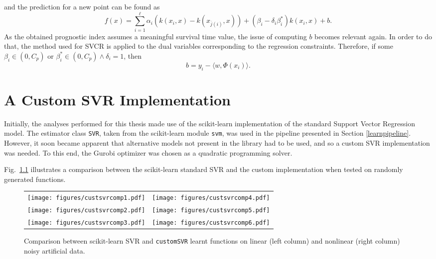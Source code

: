 \documentclass[12pt]{report}
\begin{document}
and the prediction for a new point can be found as
\begin{equation} \label{model2f}
f(x) = \sum_{i=1}^{\ell}\alpha_{i}(k(x_{i},x) - k(x_{\overline{j}(i)},x))+(\beta_{i}-\delta_{i}\beta_{i}^{*})k(x_{i},x)+b \text{.}
\end{equation}
As the obtained prognostic index assumes a meaningful survival time value, the issue of computing $b$ becomes relevant again. In order to do that, the method used for SVCR is applied to the dual variables corresponding to the regression constraints. Therefore, if some $\beta_{i} \in (0,C_{p})$ or $\beta_{i}^{*} \in (0,C_{p}) \wedge \delta_{i} = 1$, then
\begin{equation} \label{model2b3}
b = y_{i} - \langle w,\Phi(x_{i})\rangle \text{.}
\end{equation}

\chapter{A Custom SVR Implementation}
\label{chcustsvr}
Initially, the analyses performed for this thesis made use of the scikit-learn \cite{sklearn} implementation of the standard Support Vector Regression model. The estimator class \texttt{SVR}, taken from the scikit-learn module \texttt{svm}, was used in the pipeline presented in Section \ref{learnpipeline}. However, it soon became apparent that alternative models not present in the library had to be used, and so a custom SVR implementation was needed. To this end, the Gurobi optimizer \cite{gurobi} was chosen as a quadratic programming solver.

Fig.\ \ref{custsvrfig} illustrates a comparison between the scikit-learn standard SVR and the custom implementation when tested on randomly generated functions.

\begin{figure}[hp]
	\begin{adjustwidth}{-1.5in}{-1in}
  	\centering
  	\begin{tabular}{cc}
  		\texttt{[image: figures/custsvrcomp1.pdf]} & 
  		\texttt{[image: figures/custsvrcomp4.pdf]} \\
		\texttt{[image: figures/custsvrcomp2.pdf]} &
		\texttt{[image: figures/custsvrcomp5.pdf]} \\
		\texttt{[image: figures/custsvrcomp3.pdf]} &
		\texttt{[image: figures/custsvrcomp6.pdf]} \\
  	\end{tabular}
  	\end{adjustwidth}
  	\caption{Comparison between scikit-learn SVR and \texttt{customSVR} learnt functions on linear (left column) and nonlinear (right column) noisy artificial data.}
  	\label{custsvrfig}
\end{figure}
\end{document}
